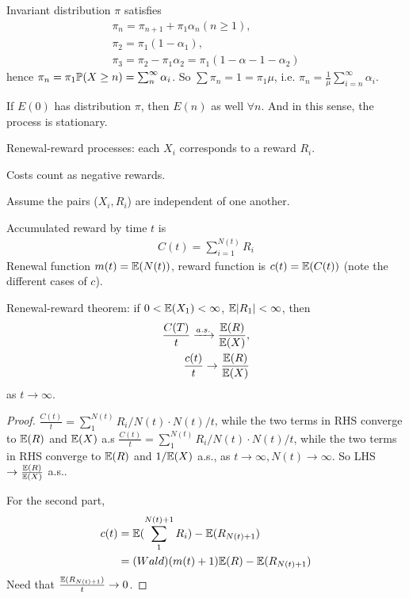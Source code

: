 \documentclass[a4paper]{article}
\begin{document}
Invariant distribution $\pi$ satisfies
\begin{equation*}
\begin{aligned}
\pi_n = \pi_{n+1} + \pi_1 \alpha_n ( n \geq 1),\\
\pi_2 = \pi_1(1-\alpha_1),\\
\pi_3 = \pi_2 - \pi_1\alpha_2 = \pi_1(1-\alpha-1-\alpha_2)
\end{aligned}
\end{equation*}
hence $\pi_n = \pi_1 \P(X \geq n) = \sum_n^\infty \alpha_i$. So $\sum \pi_n=1=\pi_1 \mu$, i.e. $\pi_n = \frac{1}{\mu} \sum_{i=n}^\infty \alpha_i$.

If $E(0)$ has distribution $\pi$, then $E(n)$ as well $\forall n$. And in this sense, the process is stationary.

Renewal-reward processes: each $X_i$ corresponds to a reward $R_i$.

Costs count as negative rewards.

Assume the pairs ($X_i,R_i$) are independent of one another.

Accumulated reward by time $t$ is
\begin{equation*}
\begin{aligned}
C(t) = \sum_{i=1}^{N(t)} R_i
\end{aligned}
\end{equation*}
Renewal function $m(t) = \E(N(t))$, reward function is $c(t) = \E(C(t))$ (note the different cases of $c$).

Renewal-reward theorem: if $0 < \E(X_1) < \infty$, $\E|R_1| < \infty$, then
\begin{equation*}
\begin{aligned}
\frac{C(T)}{t} \xrightarrow{a.s.} \frac{\E(R)}{\E(X)},\\
\frac{c(t)}{t} \to \frac{\E(R)}{\E(X)}
\end{aligned}
\end{equation*}
as $t \to \infty$.
\begin{proof}
$\frac{C(t)}{t} = \sum_1^{N(t)} R_i/N(t) \cdot N(t)/t$, while the two terms in RHS converge to $\E(R)$ and $\E(X)$ a.s
$\frac{C(t)}{t} = \sum_1^{N(t)} R_i/N(t) \cdot N(t)/t$, while the two terms in RHS converge to $\E(R)$ and $1/\E(X)$ a.s., as $t \to \infty, N(t) \to \infty$. So LHS $\to \frac{\E(R)}{\E(X)}$ a.s..

For the second part, 
\begin{equation*}
\begin{aligned}
c(t) &= \E(\sum_1^{N(t)+1} R_i) - \E(R_{N(t)+1})\\
&= (Wald) (m(t)+1) \E(R) - \E(R_{N(t)+1})
\end{aligned}
\end{equation*}
Need that $\frac{\E(R_{N(t)+1})}{t} \to 0$.
\end{proof}
\end{document}
